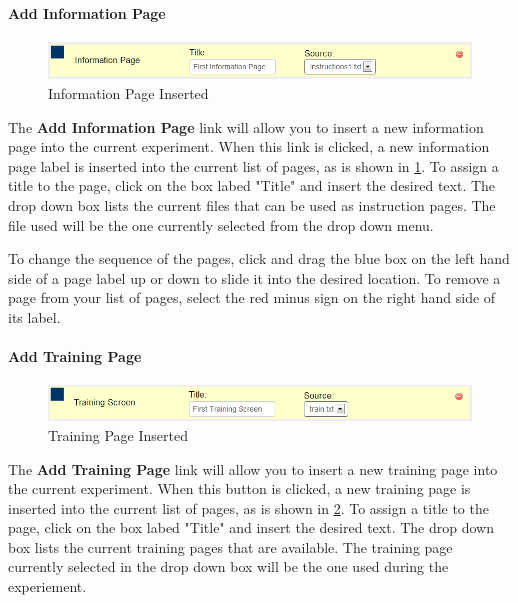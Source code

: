 \documentclass[article]{ij4uq}              %
\begin{document}
\paragraph{Add Information Page}

\begin{figure}[htb]
 \centering
 \includegraphics[width=5.0in]{figures/add_instruction.png}
 \caption{Information Page Inserted}
 \label{fig:infoInsert}
\end{figure}
\FloatBarrier

The \textbf{Add Information Page} link will allow you to insert a new information page into the current experiment. When this link is clicked, a new information page label is inserted into the current list of pages, as is shown in \ref{fig:infoInsert}.  To assign a title to the page, click on the box labed "Title" and insert the desired text.  The drop down box lists the current files that can be used as instruction pages.  The file used will be the one currently selected from the drop down menu.

To change the sequence of the pages, click and drag the blue box on the left hand side of a page label up or down to slide it into the desired location. To remove a page from your list of pages, select the red minus sign on the right hand side of its label.

\paragraph{Add Training Page}

\begin{figure}[h!]
 \centering
 \includegraphics[width=5.0in]{figures/add_training.png}
 \caption{Training Page Inserted}
 \label{fig:trainInsert}
\end{figure}
\FloatBarrier

The \textbf{Add Training Page} link will allow you to insert a new training page into the current experiment. When this button is clicked, a new training page is inserted into the current list of pages, as is shown in \ref{fig:trainInsert}.  To assign a title to the page, click on the box labed "Title" and insert the desired text.  The drop down box lists the current training pages that are available.  The training page currently selected in the drop down box will be the one used during the experiement.
\end{document}
